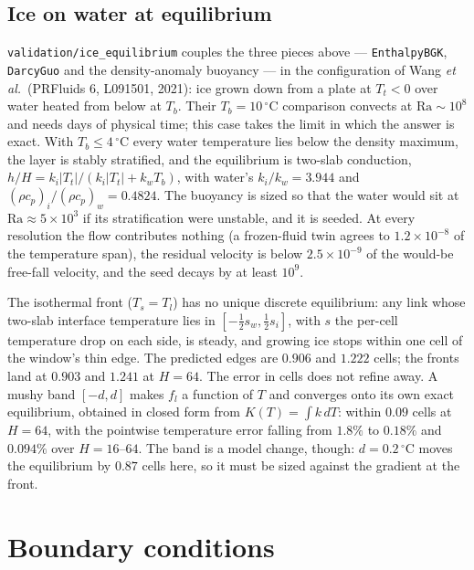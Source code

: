 \documentclass[11pt,a4paper]{article}
\newcommand{\code}[1]{\texttt{\small #1}}
\newcommand{\e}[1]{\times 10^{#1}}
\begin{document}
\subsection{Ice on water at equilibrium}
\label{sec:ice-equilibrium}

\code{validation/ice\_equilibrium} couples the three pieces above ---
\code{EnthalpyBGK}, \code{DarcyGuo} and the density-anomaly buoyancy --- in the
configuration of Wang \emph{et al.}\ (PRFluids 6, L091501, 2021): ice grown
down from a plate at $T_t<0$ over water heated from below at $T_b$. Their
$T_b = 10\,^\circ$C comparison convects at $\mathrm{Ra}\sim10^8$ and needs days
of physical time; this case takes the limit in which the answer is exact.
With $T_b\le4\,^\circ$C every water temperature lies below the density maximum,
the layer is stably stratified, and the equilibrium is two-slab conduction,
$h/H = k_i|T_t|/(k_i|T_t|+k_wT_b)$, with water's $k_i/k_w = 3.944$ and
$(\rho c_p)_i/(\rho c_p)_w = 0.4824$. The buoyancy is sized so that the water
would sit at $\mathrm{Ra}\approx5\times10^3$ if its stratification were
unstable, and it is seeded. At every resolution the flow contributes nothing
(a frozen-fluid twin agrees to $1.2\e{-8}$ of the temperature span), the residual
velocity is below $2.5\e{-9}$ of the would-be free-fall velocity, and the seed
decays by at least $10^9$.

The isothermal front ($T_s=T_l$) has no unique discrete equilibrium: any link
whose two-slab interface temperature lies in $[-\tfrac12 s_w, \tfrac12 s_i]$,
with $s$ the per-cell temperature drop on each side, is steady, and growing ice
stops within one cell of the window's thin edge. The predicted edges are $0.906$
and $1.222$ cells; the fronts land at $0.903$ and $1.241$ at $H = 64$. The error
in cells does not refine away. A mushy band $[-d,d]$ makes $f_l$ a function of
$T$ and converges onto its own exact equilibrium, obtained in closed form from
$K(T)=\int k\,dT$: within $0.09$ cells at $H=64$, with the pointwise temperature
error falling from $1.8\%$ to $0.18\%$ and $0.094\%$ over $H = 16$--$64$. The
band is a model change, though: $d = 0.2\,^\circ$C moves the equilibrium by
$0.87$ cells here, so it must be sized against the gradient at the front.

\section{Boundary conditions}
\end{document}
